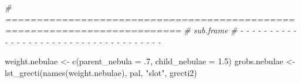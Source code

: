 \documentclass[
]{article}
\newenvironment{Shaded}{\begin{snugshade}}{\end{snugshade}}
\newcommand{\AttributeTok}[1]{\textcolor[rgb]{0.77,0.63,0.00}{#1}}
\newcommand{\CommentTok}[1]{\textcolor[rgb]{0.56,0.35,0.01}{\textit{#1}}}
\newcommand{\DecValTok}[1]{\textcolor[rgb]{0.00,0.00,0.81}{#1}}
\newcommand{\FloatTok}[1]{\textcolor[rgb]{0.00,0.00,0.81}{#1}}
\newcommand{\FunctionTok}[1]{\textcolor[rgb]{0.00,0.00,0.00}{#1}}
\newcommand{\NormalTok}[1]{#1}
\newcommand{\OtherTok}[1]{\textcolor[rgb]{0.56,0.35,0.01}{#1}}
\newcommand{\StringTok}[1]{\textcolor[rgb]{0.31,0.60,0.02}{#1}}
\begin{document}
\begin{Shaded}
\begin{Highlighting}[]
\CommentTok{\# ==========================================================================}
\CommentTok{\# sub.frame}
\CommentTok{\# {-} {-} {-} {-} {-} {-} {-} {-} {-} {-} {-} {-} {-} {-} {-} {-} {-} {-} {-} {-} {-} {-} {-} {-} {-} {-} {-} {-} {-} {-} {-} {-} {-} {-} {-} {-} {-}}

\NormalTok{weight.nebulae }\OtherTok{\textless{}{-}} \FunctionTok{c}\NormalTok{(}\AttributeTok{parent\_nebula =}\NormalTok{ .}\DecValTok{7}\NormalTok{, }\AttributeTok{child\_nebulae =} \FloatTok{1.5}\NormalTok{)}
\NormalTok{grobs.nebulae }\OtherTok{\textless{}{-}} \FunctionTok{lst\_grecti}\NormalTok{(}\FunctionTok{names}\NormalTok{(weight.nebulae), pal, }\StringTok{"slot"}\NormalTok{, grecti2)}
\end{Highlighting}
\end{Shaded}
\end{document}
